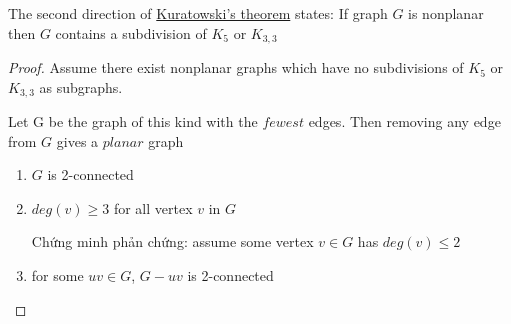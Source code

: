 The second direction of \hyperref[thr:kuratowski]{Kuratowski's theorem} states: If graph $G$ is nonplanar then $G$ contains a subdivision of $K_5$ or $K_{3,3}$
\begin{proof}
    Assume there exist nonplanar graphs which have no subdivisions of $K_5$ or $K_{3,3}$ as subgraphs.

    Let G be the graph of this kind with the $fewest$ edges. Then removing any edge from $G$ gives a $planar$ graph

    \begin{enumerate}
        \item $G$ is 2-connected
              \begin{multicols}{2}
              \end{multicols}
        \item $deg(v) \geq 3$ for all vertex $v$ in $G$

              Chứng minh phản chứng: assume some vertex $v \in G$ has $deg(v) \leq 2$

        \item for some $uv \in G$, $G - uv$ is 2-connected

              \begin{tikzpicture}

              \end{tikzpicture}
    \end{enumerate}

\end{proof}

